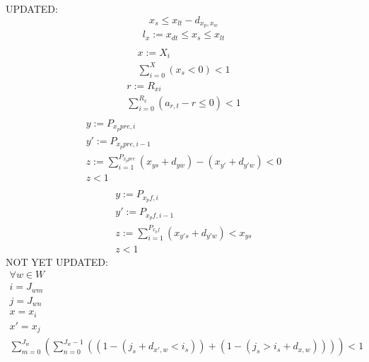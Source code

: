 \documentclass[a4paper,12pt,twoside]{scrreprt}
\begin{document}
\begin{flushleft}
	UPDATED:\linebreak
	\begin{equation}
	\label{not_late}
		x_{s} \leq x_{lt} - d_{x_{p}, x_{w}}
	\end{equation}
	\begin{equation}
		\label{check_tardiness}
		\begin{split}
			l_{x} := x_{dt} \leq x_{s} \leq x_{lt} \\
		\end{split}
	\end{equation}
	\begin{equation}
	\label{only_legal_timeslots}
	\begin{split}
		x := X_{i} \\
		\sum_{i=0}^{X} (x_{s} < 0) < 1
	\end{split}
	\end{equation}
	\begin{equation}
	\label{sufficient_resources}
	\begin{split}
		r := R_{xi} \\
		\sum_{i=0}^{R_{x}}(a_{r,t}-r\leq 0) < 1\\
	\end{split}
	\end{equation}
	\begin{equation}
	\label{no_early_start}
	\begin{split}
		y := P_{x_{p}pre, i} \\
		y' := P_{x_{p}pre, i-1} \\
		z := \sum_{i=1}^{P_{x_{p}pre}} (x_{ys} + d_{yw}) - (x_{y'} + d_{y'w}) < 0 \\
		z < 1 \\
	\end{split}
	\end{equation}
	\begin{equation}
	\label{follow_up_tasks_early_start}
	\begin{split}
		y := P_{x_{p}f, i}\\
		y' := P_{x_{p}f, i-1}\\
		z := \sum_{i=1}^{P_{x_{p}f}} (x_{y's} + d_{y'w}) < x_{ys}\\
		z < 1
	\end{split}
	\end{equation}
	NOT YET UPDATED:\linebreak
	\begin{equation}
	\label{no_multiple_workstation_occupations}
	\begin{split}
		\forall w \in W \\
		i = J_{wm} \\
		j = J_{wn} \\
		x = x_{i} \\
		x' = x_{j} \\
		\sum_{m=0}^{J_{w}} (\sum_{n = 0}^{J_{w}-1}((1-(j_{s} + d_{x',w} < i_{s})) + (1-(j_{s} > i_{s} + d_{x,w})))) < 1
	\end{split}
	\end{equation}

\end{flushleft}
\end{document}
